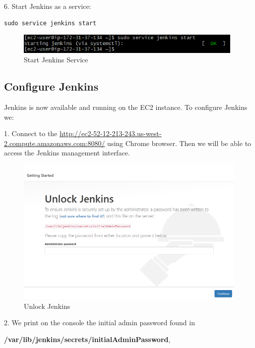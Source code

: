 \documentclass[12pt,a4paper,twoside]{article}
\begin{document}
6. Start Jenkins as a service:


\begin{verbatim}
sudo service jenkins start
\end{verbatim}


\begin{figure}[H]
    \centering
        \includegraphics[width=11cm]{images-aws/19-start-jenkins.png}
        \caption{Start Jenkins Service}
\end{figure}



\newpage

\subsection{Configure Jenkins}


Jenkins is now available and running on the EC2 instance. To configure Jenkins we:


1. Connect to the \url{http://ec2-52-12-213-243.us-west-2.compute.amazonaws.com:8080/} using Chrome browser.
Then we will be able to access the Jenkins management interface.


\begin{figure}[H]
    \centering
        \includegraphics[width=15cm]{images-aws/20-unlock-jenkins.png}
        \caption{Unlock Jenkins}
\end{figure}


2. We print on the console the initial admin password found in

 \textbf{/var/lib/jenkins/secrets/initialAdminPassword}, 
\end{document}
